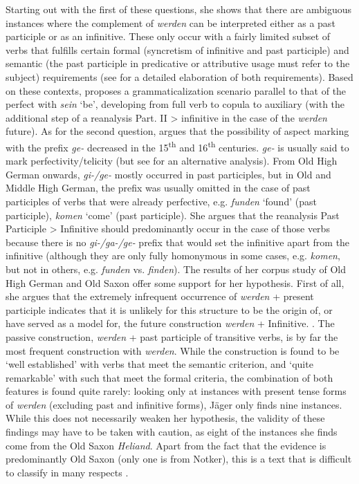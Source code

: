 \documentclass[output=paper,colorlinks,citecolor=brown]{langscibook}
\begin{document}
Starting out with the first of these questions, she shows that there are ambiguous instances where the complement of \textit{werden} can be interpreted either as a past participle or as an infinitive. These only occur with a fairly limited subset of verbs that fulfills certain formal (syncretism of infinitive and past participle) and semantic (the past participle in predicative or attributive usage must refer to the subject) requirements (see \citeauthor{Jäger2024} \citeyear{Jäger2024} for a detailed elaboration of both requirements).  Based on these contexts, \citep[][195]{Jäger2024} proposes a grammaticalization scenario parallel to that of the perfect with \textit{sein} `be', developing from full verb to copula to auxiliary (with the additional step of a reanalysis Part. II > infinitive in the case of the \textit{werden} future). As for the second question, \citet{Jäger2024} argues that the possibility of aspect marking with the prefix \textit{ge-} decreased in the 15\textsuperscript{th} and 16\textsuperscript{th} centuries. \textit{ge-} is usually said to mark perfectivity/telicity (but see \cite{fleissnerPrafixGiIm2023} for an alternative analysis). From Old High German onwards, \textit{gi-/ge-} mostly occurred in past participles, but in Old and Middle High German, the prefix was usually omitted in the case of past participles of verbs that were already perfective, e.g. \textit{funden} `found' (past participle), \textit{komen} `come' (past participle). She argues that the reanalysis Past Participle > Infinitive should predominantly occur in the case of those verbs because there is no \textit{gi-/ga-/ge-} prefix that would set the infinitive apart from the infinitive (although they are only fully homonymous in some cases, e.g. \textit{komen}, but not in others, e.g. \textit{funden} vs. \textit{finden}). The results of her corpus study of Old High German and Old Saxon  offer some support for her hypothesis. First of all, she argues that the extremely infrequent occurrence of \textit{werden} + present participle indicates that it is unlikely for this structure to be the origin of, or have served as a model for, the future construction \textit{werden} + Infinitive. \citep[14]{Jäger2024}. The passive construction, \textit{werden} + past participle of transitive verbs, is by far the most frequent construction with \textit{werden}. While the construction is found to be `well established' with verbs that meet the semantic criterion, and `quite remarkable' with such that meet the formal criteria, the combination of both features is found quite rarely: looking only at instances with present tense forms of \textit{werden} (excluding past and infinitive forms), Jäger only finds nine instances. While this does not necessarily weaken her hypothesis, the validity of these findings may have to be taken with caution, as eight of the instances she finds come from the Old Saxon \textit{Heliand}. Apart from the fact that the evidence is predominantly Old Saxon (only one is from Notker), this is a text that is difficult to classify in many respects \citep[see e.g.][]{glauchNotkerIIISt2013}.
\end{document}
